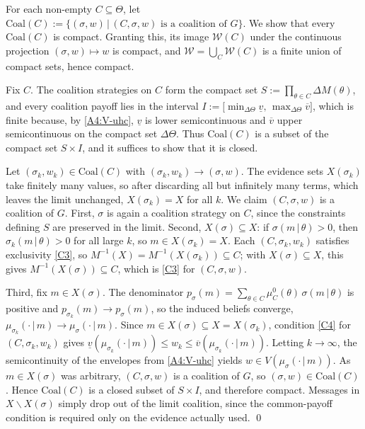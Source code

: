 \documentclass[11pt]{article}
\newcommand{\sep}{\,|\,}
\newcommand{\W}{\mathcal{W}}
\begin{document}
For each non-empty $C\subseteq\Theta$, let $\mathrm{Coal}(C):=\{(\sigma,w)\sep(C,\sigma,w)\text{ is a coalition of }G\}$. We show that every $\mathrm{Coal}(C)$ is compact. Granting this, its image $\W(C)$ under the continuous projection $(\sigma,w)\mapsto w$ is compact, and $\W=\bigcup_C\W(C)$ is a finite union of compact sets, hence compact.

Fix $C$. The coalition strategies on $C$ form the compact set $S:=\prod_{\theta\in C}\Delta M(\theta)$, and every coalition payoff lies in the interval $I:=\bigl[\min_{\Delta\Theta}\underline v,\,\max_{\Delta\Theta}\overline v\bigr]$, which is finite because, by \cref{A4:V-uhc}, $\underline v$ is lower semicontinuous and $\overline v$ upper semicontinuous on the compact set $\Delta\Theta$. Thus $\mathrm{Coal}(C)$ is a subset of the compact set $S\times I$, and it suffices to show that it is closed.

Let $(\sigma_k,w_k)\in\mathrm{Coal}(C)$ with $(\sigma_k,w_k)\to(\sigma,w)$. The evidence sets $X(\sigma_k)$ take finitely many values, so after discarding all but infinitely many terms, which leaves the limit unchanged, $X(\sigma_k)=X$ for all $k$. We claim $(C,\sigma,w)$ is a coalition of $G$. First, $\sigma$ is again a coalition strategy on $C$, since the constraints defining $S$ are preserved in the limit. Second, $X(\sigma)\subseteq X$: if $\sigma(m\sep\theta)>0$, then $\sigma_k(m\sep\theta)>0$ for all large $k$, so $m\in X(\sigma_k)=X$. Each $(C,\sigma_k,w_k)$ satisfies exclusivity \cref{C3}, so $M^{-1}(X)=M^{-1}(X(\sigma_k))\subseteq C$; with $X(\sigma)\subseteq X$, this gives $M^{-1}(X(\sigma))\subseteq C$, which is \cref{C3} for $(C,\sigma,w)$.

Third, fix $m\in X(\sigma)$. The denominator $p_\sigma(m)=\sum_{\theta\in C}\mu^0_C(\theta)\,\sigma(m\sep\theta)$ is positive and $p_{\sigma_k}(m)\to p_\sigma(m)$, so the induced beliefs converge, $\mu_{\sigma_k}(\cdot\sep m)\to\mu_\sigma(\cdot\sep m)$. Since $m\in X(\sigma)\subseteq X=X(\sigma_k)$, condition \cref{C4} for $(C,\sigma_k,w_k)$ gives $\underline v(\mu_{\sigma_k}(\cdot\sep m))\leq w_k\leq\overline v(\mu_{\sigma_k}(\cdot\sep m))$. Letting $k\to\infty$, the semicontinuity of the envelopes from \cref{A4:V-uhc} yields $w\in V(\mu_\sigma(\cdot\sep m))$. As $m\in X(\sigma)$ was arbitrary, $(C,\sigma,w)$ is a coalition of $G$, so $(\sigma,w)\in\mathrm{Coal}(C)$. Hence $\mathrm{Coal}(C)$ is a closed subset of $S\times I$, and therefore compact. Messages in $X\smallsetminus X(\sigma)$ simply drop out of the limit coalition, since the common-payoff condition is required only on the evidence actually used.
\qed
\end{document}
